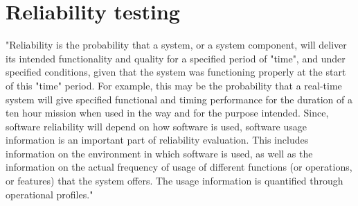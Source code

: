 \section{Reliability testing}
"Reliability is the probability that a system, or a system component, will deliver its
intended functionality and quality for a specified period of "time", and under specified
conditions, given that the system was functioning properly at the start of this "time" period. For
example, this may be the probability that a real-time system will give specified functional and
timing performance for the duration of a ten hour mission when used in the way and for the
purpose intended. Since, software reliability will depend on how software is used, software usage
information is an important part of reliability evaluation. This includes information on the
environment in which software is used, as well as the information on the actual frequency of
usage of different functions (or operations, or features) that the system offers. The usage
information is quantified through operational profiles."\cite{vouk}

